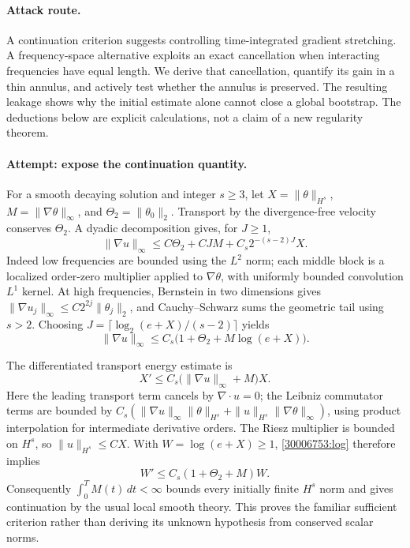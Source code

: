 \documentclass[11pt,a4paper]{article}
\numberwithin{equation}{section}
\begin{document}
\paragraph{Attack route.}
A continuation criterion suggests controlling time-integrated gradient
stretching. A frequency-space alternative exploits an exact cancellation
when interacting frequencies have equal length. We derive that cancellation,
quantify its gain in a thin annulus, and actively test whether the annulus
is preserved. The resulting leakage shows why the initial estimate alone
cannot close a global bootstrap. The deductions below are explicit
calculations, not a claim of a new regularity theorem.

\paragraph{Attempt: expose the continuation quantity.}
For a smooth decaying solution and integer $s\ge3$, let
$X=\|\theta\|_{H^s}$, $M=\|\nabla\theta\|_\infty$, and
$\Theta_2=\|\theta_0\|_2$. Transport by the divergence-free velocity
conserves $\Theta_2$. A dyadic decomposition gives, for $J\ge1$,
\[
 \|\nabla u\|_\infty
 \le C\Theta_2+CJM+C_s2^{-(s-2)J}X.
\]
Indeed low frequencies are bounded using the $L^2$ norm; each middle block
is a localized order-zero multiplier applied to $\nabla\theta$, with
uniformly bounded convolution $L^1$ kernel. At high frequencies, Bernstein
in two dimensions gives
$\|\nabla u_j\|_\infty\le C2^{2j}\|\theta_j\|_2$, and Cauchy--Schwarz
sums the geometric tail using $s>2$.
Choosing $J=\lceil\log_2(e+X)/(s-2)\rceil$ yields
\begin{equation}\label{30006753:log}
 \|\nabla u\|_\infty
 \le C_s\bigl(1+\Theta_2+M\log(e+X)\bigr).
\end{equation}

The differentiated transport energy estimate is
\[
 X'\le C_s\bigl(\|\nabla u\|_\infty+M\bigr)X.
\]
Here the leading transport term cancels by $\nabla\cdot u=0$; the
Leibniz commutator terms are bounded by
$C_s(\|\nabla u\|_\infty\|\theta\|_{H^s}
+\|u\|_{H^s}\|\nabla\theta\|_\infty)$, using product interpolation
for intermediate derivative orders. The Riesz multiplier is bounded on
$H^s$, so $\|u\|_{H^s}\le CX$. With $W=\log(e+X)\ge1$,
\eqref{30006753:log} therefore implies
\[
 W'\le C_s(1+\Theta_2+M)W.
\]
Consequently $\int_0^TM(t)\,dt<\infty$ bounds every initially finite
$H^s$ norm and gives continuation by the usual local smooth theory. This
proves the familiar sufficient criterion rather than deriving its unknown
hypothesis from conserved scalar norms.
\end{document}
